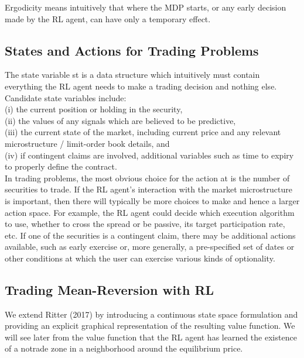 \documentclass{article}
\begin{document}
Ergodicity means intuitively that where the MDP starts, or any early decision made by the RL agent, can have only a
temporary effect.

\subsection{States and Actions for Trading Problems}
The state variable st is a data structure which intuitively must contain everything the RL agent needs to make a trading decision and nothing else. Candidate state variables include:\\
(i) the current position or holding in the security,\\
(ii) the values of any signals which are believed to be predictive,\\
(iii) the current state of the market, including current price and any relevant microstructure / limit-order book details, and\\
(iv) if contingent claims are involved, additional variables such as time to expiry to properly define the contract.\\

In trading problems, the most obvious choice for the action at is the number of securities to trade. If the RL agent’s interaction with the market microstructure is important, then there will typically be more choices to make and hence a larger action space. For example, the RL agent could decide which execution algorithm to use, whether to cross the spread or be passive, its target participation rate, etc. If one of the securities is a contingent claim, there may be additional actions available, such as early exercise or, more generally, a pre-specified set of dates or other conditions at which the user can exercise various kinds of optionality.

\subsection{Trading Mean-Reversion with RL}
We extend Ritter (2017) by introducing a continuous state space formulation and providing an explicit graphical representation of the resulting value function. We will see later from the value function that the RL agent has learned the existence of a notrade zone in a neighborhood around the equilibrium price.
\end{document}

